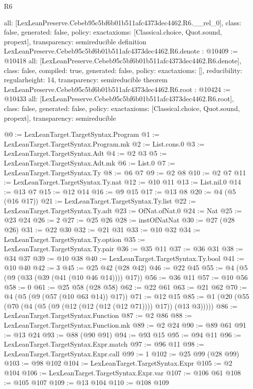 \begin{lexlean}{R6}
\begin{coremodule}
{  all: [LexLeanPreserve.Cebeb95c5bf6b01b511afc4373dec4462.R6.__rel_0],
  class: false,
  generated: false,
  policy: exact{axioms: [Classical.choice, Quot.sound, propext]},
  transparency: semireducible
}
definition LexLeanPreserve.Cebeb95c5bf6b01b511afc4373dec4462.R6.denote : @10409 := @10418 {
  all: [LexLeanPreserve.Cebeb95c5bf6b01b511afc4373dec4462.R6.denote],
  class: false,
  compiled: true,
  generated: false,
  policy: exact{axioms: []},
  reducibility: regular{height: 14},
  transparency: semireducible
}
theorem LexLeanPreserve.Cebeb95c5bf6b01b511afc4373dec4462.R6.root : @10424 := @10433 {
  all: [LexLeanPreserve.Cebeb95c5bf6b01b511afc4373dec4462.R6.root],
  class: false,
  generated: false,
  policy: exact{axioms: [Classical.choice, Quot.sound, propext]},
  transparency: semireducible
}

@0 := LexLeanTarget.TargetSyntax.Program
@1 := LexLeanTarget.TargetSyntax.Program.mk
@2 := List.cons.{0}
@3 := LexLeanTarget.TargetSyntax.Adt
@4 := @2 @3
@5 := LexLeanTarget.TargetSyntax.Adt.mk
@6 := List.{0}
@7 := LexLeanTarget.TargetSyntax.Ty
@8 := @6 @7
@9 := @2 @8
@10 := @2 @7
@11 := LexLeanTarget.TargetSyntax.Ty.nat
@12 := @10 @11
@13 := List.nil.{0}
@14 := @13 @7
@15 := @12 @14
@16 := @9 @15
@17 := @13 @8
@20 := @4 (@5 (@16 @17))
@21 := LexLeanTarget.TargetSyntax.Ty.list
@22 := LexLeanTarget.TargetSyntax.Ty.adt
@23 := OfNat.ofNat.{0}
@24 := Nat
@25 := @23 @24
@26 := 2
@27 := @25 @26
@28 := instOfNatNat
@30 := @27 (@28 @26)
@31 := @22 @30
@32 := @21 @31
@33 := @10 @32
@34 := LexLeanTarget.TargetSyntax.Ty.option
@35 := LexLeanTarget.TargetSyntax.Ty.pair
@36 := @35 @11
@37 := @36 @31
@38 := @34 @37
@39 := @10 @38
@40 := LexLeanTarget.TargetSyntax.Ty.bool
@41 := @10 @40
@42 := 3
@45 := @25 @42 (@28 @42)
@46 := @22 @45
@55 := @4 (@5 (@9 (@33 (@39 (@41 (@10 @46 @14)))) @17))
@56 := @36 @11
@57 := @10 @56
@58 := 0
@61 := @25 @58 (@28 @58)
@62 := @22 @61
@63 := @21 @62
@70 := @4 (@5 (@9 (@57 (@10 @63 @14)) @17))
@71 := @12 @15
@85 := @1 (@20 (@55 (@70 (@4 (@5 (@9 (@12 (@12 (@12 (@12 @71)))) @17)) (@13 @3)))))
@86 := LexLeanTarget.TargetSyntax.Function
@87 := @2 @86
@88 := LexLeanTarget.TargetSyntax.Function.mk
@89 := @2 @24
@90 := @89 @61
@91 := @13 @24
@93 := @88 (@90 @91)
@94 := @93 @15
@95 := @94 @11
@96 := LexLeanTarget.TargetSyntax.Expr.match
@97 := @96 @11
@98 := LexLeanTarget.TargetSyntax.Expr.call
@99 := 1
@102 := @25 @99 (@28 @99)
@103 := @98 @102
@104 := LexLeanTarget.TargetSyntax.Expr
@105 := @2 @104
@106 := LexLeanTarget.TargetSyntax.Expr.var
@107 := @106 @61
@108 := @105 @107
@109 := @13 @104
@110 := @108 @109

\end{coremodule}
\end{lexlean}

